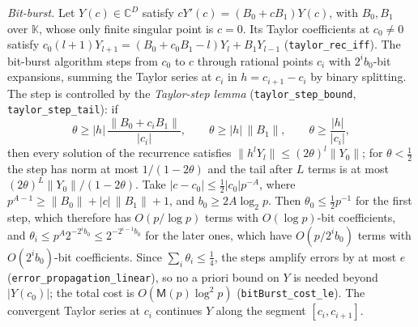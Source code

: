 \documentclass[11pt,reqno]{amsart}
\theoremstyle{definition}
\theoremstyle{remark}
\newcommand{\CC}{\mathbb{C}}
\newcommand{\Mul}{\mathsf{M}}
\begin{document}
\begin{small}
\emph{Bit-burst.} Let $Y(c) \in \CC^D$ satisfy $cY'(c) = (B_0 + cB_1)Y(c)$, with $B_0, B_1$ over $\mathbb K$, whose
only finite singular point is $c = 0$. Its Taylor coefficients at $c_0 \ne 0$ satisfy
$c_0(l+1)Y_{l+1} = (B_0 + c_0B_1 - l)Y_l + B_1Y_{l-1}$ (\nolinkurl{taylor_rec_iff}). The bit-burst algorithm
\cite{CC90,vdH99} steps from $c_0$ to $c$ through rational points $c_i$ with $2^ib_0$-bit expansions, summing the
Taylor series at $c_i$ in $h = c_{i+1} - c_i$ by binary splitting. The step is controlled by the \emph{Taylor-step
lemma} (\nolinkurl{taylor_step_bound}, \nolinkurl{taylor_step_tail}): if
\[
  \theta \ge |h|\,\frac{\|B_0 + c_iB_1\|}{|c_i|}, \qquad \theta \ge |h|\,\|B_1\|, \qquad \theta \ge \frac{|h|}{|c_i|},
\]
then every solution of the recurrence satisfies $\|h^lY_l\| \le (2\theta)^l\|Y_0\|$; for $\theta < \frac12$ the
step has norm at most $1/(1-2\theta)$ and the tail after $L$ terms is at most $(2\theta)^L\|Y_0\|/(1-2\theta)$.
Take $|c - c_0| \le \frac12|c_0|p^{-A}$, where $p^{A-1} \ge \|B_0\| + |c|\,\|B_1\| + 1$, and
$b_0 \ge 2A\log_2p$. Then $\theta_0 \le \frac12p^{-1}$ for the first step, which therefore has $O(p/\log p)$ terms
with $O(\log p)$-bit coefficients, and $\theta_i \le p^A2^{-2^ib_0} \le 2^{-2^{i-1}b_0}$ for the later ones, which have
$O(p/2^ib_0)$ terms with $O(2^ib_0)$-bit coefficients. Since $\sum_i\theta_i \le \frac14$, the steps amplify errors by at most $e$
(\nolinkurl{error_propagation_linear}), so no a priori bound on $Y$ is needed beyond $|Y(c_0)|$; the total cost is
$O(\Mul(p)\log^2p)$ (\nolinkurl{bitBurst_cost_le}). The convergent Taylor series at $c_i$ continues $Y$ along the
segment $[c_i, c_{i+1}]$.


\end{small}
\end{document}
